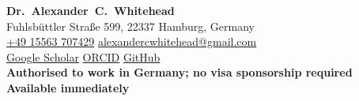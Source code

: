 \documentclass{cv}
\begin{document}
    \setlength{\parindent}{0pt}

    {\LARGE\textbf{Dr.~Alexander~C.~Whitehead}}\\
    {\small
    Fuhlsbüttler Straße 599, 22337 Hamburg, Germany\\
    \href{tel:+4915563707429}{+49 15563 707429} \textbar{} \href{mailto:alexandercwhitehead@gmail.com}{alexandercwhitehead@gmail.com}\\
    \href{https://scholar.google.com/citations?user=-hH_J28AAAAJ}{Google Scholar}
    \textbar{}
    \href{https://orcid.org/0000-0002-9151-3295}{ORCID}
    \textbar{}
    \href{https://github.com/ALEXJAZZ008008}{GitHub}\\
    \textbf{Authorised to work in Germany; no visa sponsorship required \textbar{} Available immediately}}

    \vspace{0.35cm}
\end{document}

